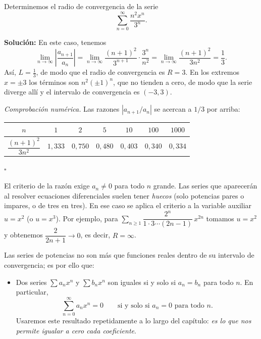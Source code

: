  \begin{example}
     Determinemos el radio de convergencia de la serie $$\sum_{n=0}^{\infty} \frac{n^2 x^n}{3^n}.$$
 
\noindent \textbf{Solución:} \quad En este caso, tenemos
\[ \lim_{n \to \infty} \left| \frac{a_{n+1}}{a_n} \right| = \lim_{n \to \infty} \frac{(n+1)^2}{3^{n+1}} \cdot \frac{3^n}{n^2} = \lim_{n \to \infty} \frac{(n+1)^2}{3n^2} = \frac{1}{3}. \]
Así, $L = \frac{1}{3}$, de modo que el radio de convergencia es $R = 3$. En los extremos $x=\pm 3$ los términos son $n^2(\pm 1)^n$, que no tienden a cero, de modo que la serie diverge allí y el intervalo de convergencia es $(-3, 3)$.
 
\vspace{.2cm}
\noindent\textit{Comprobación numérica.} Las razones $|a_{n+1}/a_n|$ se acercan a $1/3$ por arriba:
\begin{center}
\small
\begin{tabular}{|c|c|c|c|c|c|c|}
\hline
\rowcolor{bbe!15}$n$ & $1$ & $2$ & $5$ & $10$ & $100$ & $1000$ \\ \hline
$\dfrac{(n+1)^2}{3n^2}$ & $1{,}333$ & $0{,}750$ & $0{,}480$ & $0{,}403$ & $0{,}340$ & $0{,}334$ \\ \hline
\end{tabular}
\end{center}
\hfill $\square$
 \end{example}
 
\begin{note}
El criterio de la razón exige $a_n\neq 0$ para todo $n$ grande. Las series que aparecerán al resolver ecuaciones diferenciales suelen tener \emph{huecos} (solo potencias pares o impares, o de tres en tres). En ese caso se aplica el criterio a la variable auxiliar $u=x^2$ (o $u=x^3$). Por ejemplo, para $\sum_{n\ge 1} \dfrac{2^n}{1\cdot 3\cdots(2n-1)}\,x^{2n}$ tomamos $u=x^2$ y obtenemos $\dfrac{2}{2n+1}\to 0$, es decir, $R=\infty$.
\end{note}
 
Las series de potencias no son más que funciones reales dentro de su intervalo de convergencia; es por ello que:
 
\begin{itemize}
\item Dos series $\sum a_n x^n$ y $\sum b_n x^n$ son iguales si y solo si $a_n = b_n$ para todo $n$. En particular,
\[ \sum_{n=0}^{\infty} a_n x^n = 0 \qquad \text{si y solo si } a_n = 0 \text{ para todo } n. \]
Usaremos este resultado repetidamente a lo largo del capítulo: \emph{es lo que nos permite igualar a cero cada coeficiente}.
\end{itemize}
 
